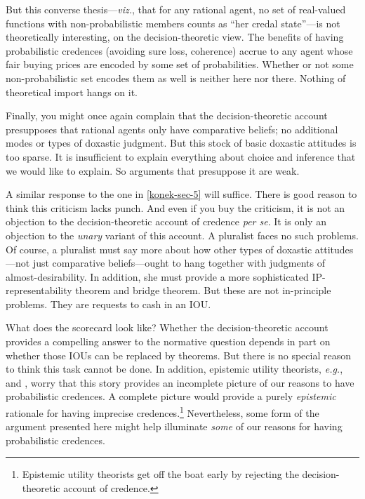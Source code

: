 But this converse thesis---\textit{viz.}, that for any rational agent, no set of real-valued functions with non-probabilistic members counts as ``her credal state''---is not theoretically interesting, on the decision-theoretic view. The benefits of having probabilistic credences (avoiding sure loss, coherence) accrue to any agent whose fair buying prices are encoded by some set of probabilities. Whether or not some non-probabilistic set encodes them as well is neither here nor there. Nothing of theoretical import hangs on it.

Finally, you might once again complain that the decision-theoretic account presupposes that rational agents only have comparative beliefs; no additional modes or types of doxastic judgment. But this stock of basic doxastic attitudes is too sparse. It is insufficient to explain everything about choice and inference that we would like to explain. So arguments that presuppose it are weak.

A similar response to the one in \autoref{konek-sec-5} will suffice. There is good reason to think this criticism lacks punch. And even if you buy the criticism, it is not an objection to the decision-theoretic account of credence \textit{per se}. It is only an objection to the \textit{unary} variant of this account. A pluralist faces no such problems. Of course, a pluralist must say more about how other types of doxastic attitudes---not just comparative beliefs---ought to hang together with judgments of almost-desirability. In addition, she must provide a more sophisticated IP-representability theorem and bridge theorem. But these are not in-principle problems. They are requests to cash in an IOU.

What does the scorecard look like? Whether the decision-theoretic account provides a compelling answer to the normative question depends in part on whether those IOUs can be replaced by theorems. But there is no special reason to think this task cannot be done. In addition, epistemic utility theorists, \textit{e.g.}, \citet{Joyce1998, Joyce2009} and \citet{Pettigrew2016}, worry that this story provides an incomplete picture of our reasons to have probabilistic credences. A complete picture would provide a purely \textit{epistemic} rationale for having imprecise credences.\footnote{Epistemic utility theorists get off the boat early by rejecting the decision-theoretic account of credence.} Nevertheless, some form of the argument presented here might help illuminate \textit{some} of our reasons for having probabilistic credences.


